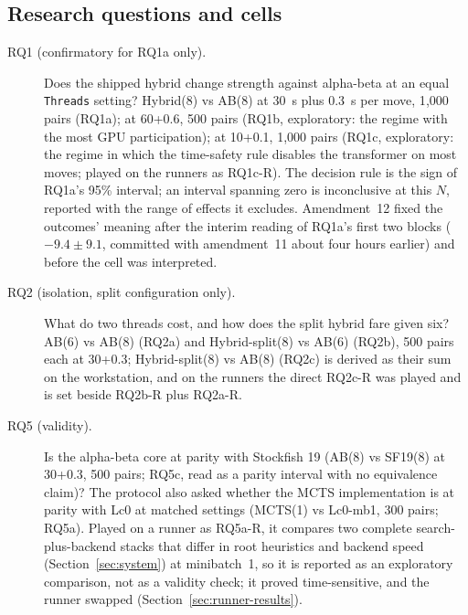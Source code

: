 \documentclass{article}
\begin{document}
\subsection{Research questions and cells}
\label{sec:rqs}
\begin{description}
  \item[RQ1 (confirmatory for RQ1a only).] Does the shipped hybrid change strength against alpha-beta at an equal \texttt{Threads} setting? Hybrid(8) vs AB(8) at 30~s plus 0.3~s per move, 1{,}000 pairs (RQ1a); at 60+0.6, 500 pairs (RQ1b, exploratory: the regime with the most GPU participation); at 10+0.1, 1{,}000 pairs (RQ1c, exploratory: the regime in which the time-safety rule disables the transformer on most moves; played on the runners as RQ1c-R). The decision rule is the sign of RQ1a's 95\% interval; an interval spanning zero is inconclusive at this $N$, reported with the range of effects it excludes. Amendment~12 fixed the outcomes' meaning after the interim reading of RQ1a's first two blocks ($-9.4 \pm 9.1$, committed with amendment~11 about four hours earlier) and before the cell was interpreted.
  \item[RQ2 (isolation, split configuration only).] What do two threads cost, and how does the split hybrid fare given six? AB(6) vs AB(8) (RQ2a) and Hybrid-split(8) vs AB(6) (RQ2b), 500 pairs each at 30+0.3; Hybrid-split(8) vs AB(8) (RQ2c) is derived as their sum on the workstation, and on the runners the direct RQ2c-R was played and is set beside RQ2b-R plus RQ2a-R.
  \item[RQ5 (validity).] Is the alpha-beta core at parity with Stockfish 19 (AB(8) vs SF19(8) at 30+0.3, 500 pairs; RQ5c, read as a parity interval with no equivalence claim)? The protocol also asked whether the MCTS implementation is at parity with Lc0 at matched settings (MCTS(1) vs Lc0-mb1, 300 pairs; RQ5a). Played on a runner as RQ5a-R, it compares two complete search-plus-backend stacks that differ in root heuristics and backend speed (Section~\ref{sec:system}) at minibatch~1, so it is reported as an exploratory comparison, not as a validity check; it proved time-sensitive, and the runner swapped (Section~\ref{sec:runner-results}).

\end{description}
\end{document}
